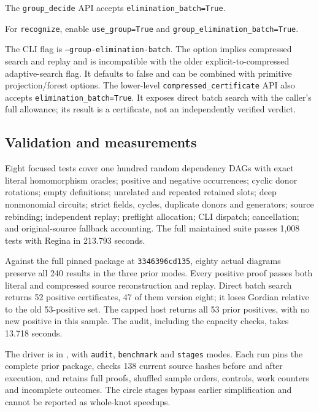 The \texttt{group\_decide} API accepts \texttt{elimination\_batch=True}.

For \texttt{recognize}, enable \texttt{use\_group=True} and
\texttt{group\_elimination\_batch=True}.

The CLI flag is \texttt{--group-elimination-batch}. The option implies
compressed search and replay and is incompatible with the older
explicit-to-compressed adaptive-search flag. It defaults to false and can
be combined with primitive projection/forest options. The lower-level
\texttt{compressed\_certificate} API also accepts
\texttt{elimination\_batch=True}. It exposes direct batch search with
the caller's full allowance; its result is a
certificate, not an independently verified verdict.

\subsection{Validation and measurements}

Eight focused tests cover one hundred random dependency DAGs with exact
literal homomorphism oracles; positive and negative occurrences; cyclic
donor rotations; empty definitions; unrelated and repeated retained slots;
deep nonmonomial circuits; strict fields, cycles, duplicate donors and
generators; source rebinding; independent replay; preflight allocation;
CLI dispatch; cancellation; and original-source fallback accounting.
The full maintained suite passes 1,008 tests with Regina in 213.793 seconds.

Against the full pinned package at \texttt{3346396cd135}, eighty actual
diagrams preserve all 240 results in the three prior modes. Every positive
proof passes both literal and compressed source reconstruction and replay.
Direct batch search returns 52 positive certificates, 47 of them version
eight; it loses Gordian relative to the old 53-positive set. The capped host
returns all 53 prior positives, with no new positive in this sample.
The audit, including the capacity checks, takes 13.718 seconds.



The driver is  in
, with \texttt{audit}, \texttt{benchmark} and \texttt{stages}
modes. Each run pins the complete prior package, checks 138 current source
hashes before and after execution, and retains full proofs, shuffled sample
orders, controls, work counters and incomplete outcomes. The circle stages
bypass earlier simplification and cannot be reported as whole-knot speedups.


